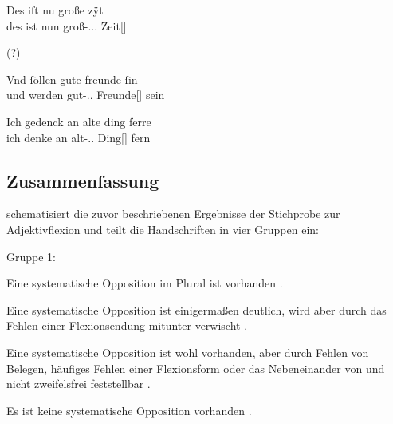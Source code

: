 \begin{exe}
\ex \label{ex:kczregel}
	\begin{xlist}
	\ex \label{ex:kczregel_1}
		\gll Des iſt nu große zÿt \\
			des ist nun groß-\Nom.\Sg.\FemI.\St{} Zeit[\FemI] \\
		\begin{taggedline}{\parencites[\pno~233\ra, 17]{kc:Z}[zu][11620]{schroeder1895}}
		\trans {} (?)
		\end{taggedline}

	\ex \label{ex:kczregel_2}
		\gll Vnd ſöllen gute freunde ſin \\
			und werden gut-\Nom.\Pl.\St{} Freunde[\MascA] sein \\
		\begin{taggedline}{\parencites[\pno~61\va, 1]{kc:Z}[vgl.][3089]{schroeder1895}}
		\trans {}
		\end{taggedline}

	\ex \label{ex:kczregel_3}
		\gll Ich gedenck an alte ding ferre \\
			ich denke an alt-\Acc.\Pl.\St{} Ding[\NeutI] fern \\
		\begin{taggedline}{\parencites[\pno~135\ra, 9]{kc:Z}[vgl.][6849]{schroeder1895}}
		\trans {}
		\end{taggedline}
	\end{xlist}
\end{exe}

\subsection{Zusammenfassung}

 schematisiert die zuvor beschriebenen Ergebnisse der
Stichprobe zur Adjektivflexion und teilt die Handschriften in vier Gruppen ein:

\begin{labeling}{Gruppe 1:}
	\item[Gruppe 1:] Eine systematische Opposition im Plural ist vorhanden
	\autocites{kc:A1}{kc:B1}.

	\item[Gruppe 2:] Eine systematische Opposition ist einigermaßen deutlich,
	wird aber durch das Fehlen einer Flexionsendung mitunter verwischt
	\autocites{kc:C1}.

	\item[Gruppe 3:] Eine systematische Opposition ist wohl vorhanden, aber
	durch Fehlen von Belegen, häufiges Fehlen einer Flexionsform oder das
	Nebeneinander von  und  nicht zweifelsfrei feststellbar
	\autocites{kc:M}{kc:VB}{kc:K}.

	\item[Gruppe 4:] Es ist keine systematische Opposition vorhanden
	\autocites{kc:H}{kc:P}{kc:Z}.
\end{labeling}

